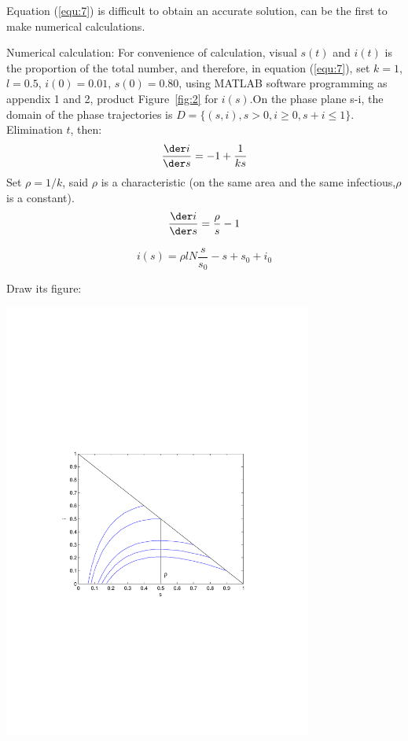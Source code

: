 Equation (\ref{equ:7}) is difficult to obtain an accurate
solution, can be the first to make numerical calculations.\par
  Numerical calculation: For convenience of calculation, visual
$ s(t) $ and $ i(t) $ is the proportion of the total number,
and therefore, in equation (\ref{equ:7}), set $k=1$,
$l=0.5$, $i(0)=0.01$, $s(0)=0.80$, using MATLAB software
programming as appendix 1 and 2, product Figure~\ref{fig:2} for
$i(s)$.On the phase plane s-i, the domain of the phase
trajectories is $ D=\{(s,i),s>0,i\geq 0,s+i\leq1\} $.\\
Elimination $ t $, then:
\begin{equation}
\frac{{\der}i}{{\der}s}=-1+\frac{1}{ks}
\label{equ:8}
\end{equation}
Set $\rho=1/k$, said $\rho$ is a characteristic (on the
same area and the same infectious,$\rho$ is a constant).
\begin{equation}
\frac{{\der}i}{{\der}s}=\frac{\rho}{s}-1
\label{equ:9}
\end{equation}

\begin{equation}
i(s)=\rho lN\frac{s}{s_0}-s+s_0+i_0
\label{equ:10}
\end{equation}

Draw its figure:\par
\begin{center}
\includegraphics[width=4in]{imgs/i(s)_i_s.pdf}
\end{center}

